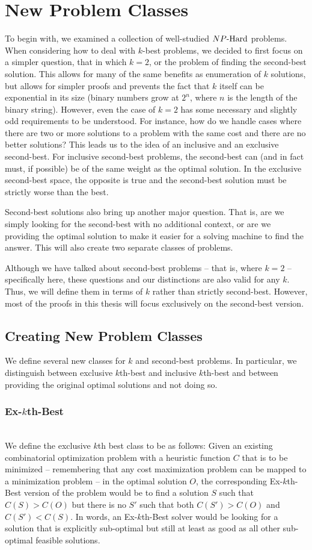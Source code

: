 \chapter{New Problem Classes}
To begin with, we examined a collection of well-studied ${NP\text{-Hard{}}}$ problems. When considering how to deal with $k$-best problems, we decided to first focus on a simpler question, that in which $k = 2$, or the problem of finding the second-best solution. This allows for many of the same benefits as enumeration of $k$ solutions, but allows for simpler proofs and prevents the fact that $k$ itself can be exponential in its size (binary numbers grow at $2^n$, where $n$ is the length of the binary string). However, even the case of $k=2$ has some necessary and slightly odd requirements to be understood. For instance, how do we handle cases where there are two or more solutions to a problem with the same cost and there are no better solutions? This leads us to the idea of an inclusive and an exclusive second-best. For inclusive second-best problems, the second-best can (and in fact must, if possible) be of the same weight as the optimal solution. In the exclusive second-best space, the opposite is true and the second-best solution must be strictly worse than the best. 

Second-best solutions also bring up another major question. That is, are we simply looking for the second-best with no additional context, or are we providing the optimal solution to make it easier for a solving machine to find the answer. This will also create two separate classes of problems.

Although we have talked about second-best problems -- that is, where $k = 2$ -- specifically here, these questions and our distinctions are also valid for any $k$. Thus, we will define them in terms of $k$ rather than strictly second-best. However, most of the proofs in this thesis will focus exclusively on the second-best version.

\section{Creating New Problem Classes}
    We define several new classes for $k$ and second-best problems. In particular, we distinguish between exclusive $k$th-best and inclusive $k$th-best and between providing the original optimal solutions and not doing so.
\subsection{{Ex-$k$th-Best}}
\hfill\\
We define the exclusive $k$th best class to be as follows: Given an existing combinatorial optimization problem with a heuristic function $C$ that is to be minimized -- remembering that any cost maximization problem can be mapped to a minimization problem -- in the optimal solution $O$, the corresponding {Ex-$k$th-Best} version of the problem would be to find a solution $S$ such that $C(S) > C(O)$ but there is no $S'$ such that both $C(S') > C(O)$ and $C(S') < C(S)$. In words, an {Ex-$k$th-Best} solver would be looking for a solution that is explicitly sub-optimal but still at least as good as all other sub-optimal feasible solutions.
